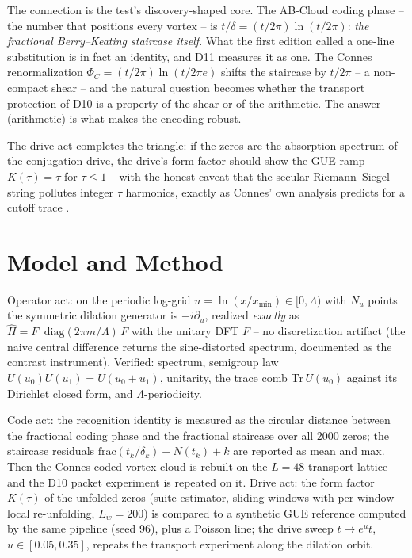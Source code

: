\documentclass[11pt,a4paper]{article}
\begin{document}
The connection is the test's discovery-shaped core. The AB-Cloud coding phase -- the number that positions every vortex -- is $t/\delta = (t/2\pi)\ln(t/2\pi)$: \emph{the fractional Berry--Keating staircase itself}. What the first edition called a one-line substitution is in fact an identity, and D11 measures it as one. The Connes renormalization $\Phi_C = (t/2\pi)\ln(t/2\pi e)$ shifts the staircase by $t/2\pi$ -- a non-compact shear -- and the natural question becomes whether the transport protection of D10 is a property of the shear or of the arithmetic. The answer (arithmetic) is what makes the encoding robust.

The drive act completes the triangle: if the zeros are the absorption spectrum of the conjugation drive, the drive's form factor should show the GUE ramp -- $K(\tau) = \tau$ for $\tau \le 1$ -- with the honest caveat that the secular Riemann--Siegel string pollutes integer $\tau$ harmonics, exactly as Connes' own analysis predicts for a cutoff trace \cite{connes}.

\section{Model and Method}
Operator act: on the periodic log-grid $u = \ln(x/x_{\min}) \in [0, \Lambda)$ with $N_u$ points the symmetric dilation generator is $-i\partial_u$, realized \emph{exactly} as $\hat{H} = F^\dagger\, \mathrm{diag}(2\pi m/\Lambda)\, F$ with the unitary DFT $F$ -- no discretization artifact (the naive central difference returns the sine-distorted spectrum, documented as the contrast instrument). Verified: spectrum, semigroup law $U(u_0)U(u_1) = U(u_0 + u_1)$, unitarity, the trace comb $\mathrm{Tr}\, U(u_0)$ against its Dirichlet closed form, and $\Lambda$-periodicity.

Code act: the recognition identity is measured as the circular distance between the fractional coding phase and the fractional staircase over all 2000 zeros; the staircase residuals $\mathrm{frac}(t_k/\delta_k) - N(t_k) + k$ are reported as mean and max. Then the Connes-coded vortex cloud is rebuilt on the $L=48$ transport lattice and the D10 packet experiment is repeated on it. Drive act: the form factor $K(\tau)$ of the unfolded zeros (suite estimator, sliding windows with per-window local re-unfolding, $L_w = 200$) is compared to a synthetic GUE reference computed by the same pipeline (seed 96), plus a Poisson line; the drive sweep $t \to e^{u}t$, $u \in [0.05, 0.35]$, repeats the transport experiment along the dilation orbit.
\end{document}
